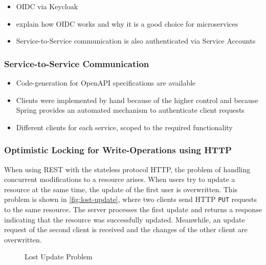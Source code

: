 \begin{itemize}
    \item OIDC via Keycloak
    \item explain how OIDC works and why it is a good choice for microservices
    \item Service-to-Service communication is also authenticated via Service Accounts
\end{itemize}

\subsubsection{Service-to-Service Communication}

\begin{itemize}
    \item Code-generation for OpenAPI specifications are available
    \item Clients were implemented by hand because of the higher control and because Spring provides an automated mechanism to authenticate client requests
    \item Different clients for each service, scoped to the required functionality
\end{itemize}

\subsubsection{Optimistic Locking for Write-Operations using \acs{HTTP}}

When using \ac{REST} with the stateless protocol \ac{HTTP}, the problem of handling concurrent modifications to a resource arises.
When users try to update a resource at the same time, the update of the first user is overwritten.
This problem is shown in \autoref{fig:lost-update}, where two clients send \ac{HTTP} \texttt{PUT} requests to the same resource.
The server processes the first update and returns a response indicating that the resource was successfully updated.
Meanwhile, an update request of the second client is received and the changes of the other client are overwritten.

\begin{figure}[!htb]
    \centering
    
    \caption{Lost Update Problem}\label{fig:lost-update}
\end{figure}

